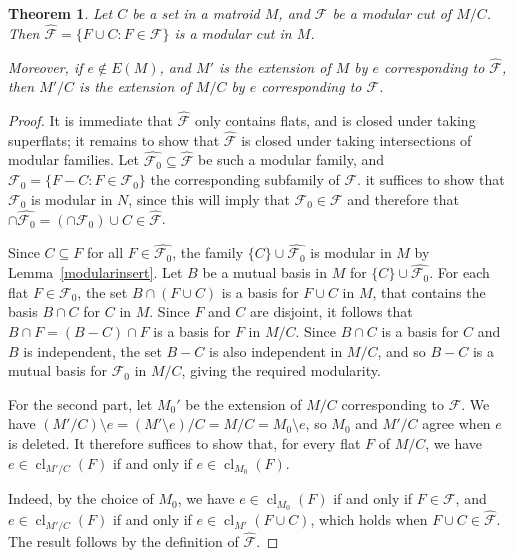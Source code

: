 \documentclass{amsart}
\theoremstyle{plain}
\newtheorem{theorem}{Theorem}[section]
\theoremstyle{definition}
\newcommand{\cF}{\mathcal{F}}
\DeclareMathOperator{\cl}{cl}
\newcommand{\del}{\!\setminus\!}
\newcommand{\con}{/}
\newcommand{\wh}{\widehat}
\renewcommand{\ss}{\subseteq}
\begin{document}
\begin{theorem}\label{contractmodularcut}
  Let $C$ be a set in a matroid $M$, and $\cF$ be a modular cut of $M \con C$. 
  Then $\wh{\cF} = \{F \cup C : F \in \cF\}$ is a modular cut in $M$. 

  Moreover, if $e \notin E(M)$, and $M'$ is the extension of $M$ by $e$ corresponding to $\wh{\cF}$, 
  then $M' \con C$ is the extension of $M \con C$ by $e$ corresponding to $\cF$. 
\end{theorem}
\begin{proof}
  It is immediate that $\wh{\cF}$ only contains flats, and is closed under taking superflats; it remains 
  to show that $\wh{\cF}$ is closed under taking intersections of modular families. 
  Let $\wh{\cF_0} \ss \wh{\cF}$ be such a modular family, and $\cF_0 = \{F - C : F \in \cF_0\}$ 
  the corresponding subfamily of $\cF$. 
  it suffices to show that $\cF_0$ is modular in $N$, 
  since this will imply that $\cF_0 \in \cF$ and therefore that $\cap \wh{\cF_0} = (\cap \cF_0) \cup C \in \wh{\cF}$. 

  Since $C \ss F$ for all $F \in \wh{\cF_0}$, the family $\{C\} \cup \wh{\cF_0}$ is modular in $M$ by Lemma~\ref{modularinsert}. 
  Let $B$ be a mutual basis in $M$ for $\{C\} \cup \wh{\cF_0}$. 
  For each flat $F \in \cF_0$, the set $B \cap (F \cup C)$ is a basis for $F \cup C$ in $M$, 
  that contains the basis $B \cap C$ for $C$ in $M$.
  Since $F$ and $C$ are disjoint, it follows that $B \cap F = (B - C) \cap F$ is a basis for $F$ in $M \con C$. 
  Since $B \cap C$ is a basis for $C$ and $B$ is independent, the set $B-C$ is also independent in $M \con C$,
  and so $B - C$ is a mutual basis for $\cF_0$ in $M \con C$, giving the required modularity. 

  For the second part, let $M_0'$ be the extension of $M \con C$ corresponding to $\cF$. 
  We have $(M' \con C) \del e = (M' \del e) \con C = M \con C = M_0 \del e$, so $M_0$ and $M' \con C$ 
  agree when $e$ is deleted. It therefore suffices to show that, for every flat $F$ of $M \con C$, 
  we have $e \in \cl_{M' \con C}(F)$ if and only if $e \in \cl_{M_0}(F)$. 

  Indeed, by the choice of $M_0$, we have $e \in \cl_{M_0}(F)$ if and only if $F \in \cF$, 
  and $e \in \cl_{M' \con C}(F)$ if and only if $e \in \cl_{M'}(F \cup C)$, which holds 
  when $F \cup C \in \wh{\cF}$. The result follows by the definition of $\wh{\cF}$. 
\end{proof}
\end{document}
